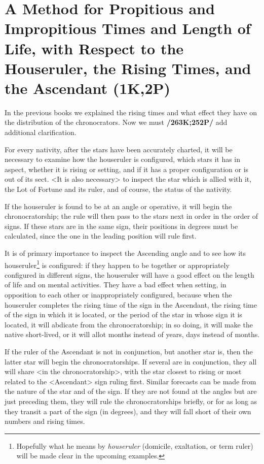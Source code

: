 \section{A Method for Propitious and Impropitious Times and Length of Life, with Respect to the Houseruler, the Rising Times, and the Ascendant (1K,2P)}

In the previous books we explained the rising times and what effect they have on the distribution of the chronocrators. Now we must \textbf{/263K;252P/} add additional clarification. 

For \mndl every nativity, after the stars  have been accurately charted, it will be necessary to examine how the houseruler is configured, which stars it has in aspect, whether it is rising or setting, and if it has a proper configuration or is out of its sect. <It is also necessary> to inspect the star which is allied with it, the Lot of Fortune and its ruler, and of course, the status of the nativity.

If the houseruler is found to be at an angle or operative, it will begin the chronocratorship; the rule will then pass to the stars next in order in the order of signs. If these stars are in the same sign, their positions
in degrees must be calculated, since the one in the leading position will rule first. 

  
It is of primary importance to inspect the Ascending angle and to see how its houseruler\footnote{Hopefully what he means by \textsl{houseruler} (domicile, exaltation, or term ruler) will be made clear in the upcoming examples.} is configured: if they happen to be together or appropriately configured in different signs, the houseruler will have a good effect on the length of life and on mental activities. They have a bad effect when setting, in opposition to each other or inappropriately configured, because when the houseruler completes the rising time of the sign in the Ascendant, the rising time of the sign in which it is located, or the period of the star in whose sign it is located, it will abdicate from the chronocratorship; in so doing, it will make the native short-lived, or it will allot months instead of years, days instead of months.

If the ruler of the Ascendant is not in conjunction, but another star is, then the latter star will begin the chronocratorships. If several are in conjunction, they all will share <in the chronocratorship>, with the star closest to rising or most related to the <Ascendant> sign ruling first. Similar forecasts can be made from the nature of the star and of the sign. If they are not found at the angles but are just preceding them, they will rule the chronocratorships briefly, or for as long as they transit a part of the sign (in degrees), and they will fall short of their own numbers and rising times.

